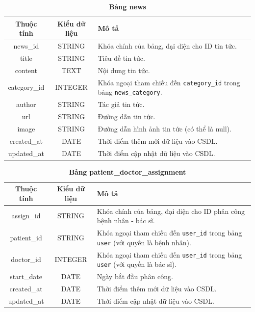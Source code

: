 \begin{table}[H]
  \caption{\bfseries \fontsize{12pt}{0pt}\selectfont Bảng news}
  \centering
  \begin{tabularx}{0.9\textwidth}{|c|c|X|}
    \hline
    \textbf{Thuộc tính} & \textbf{Kiểu dữ liệu} & \textbf{Mô tả} \\
    \hline
    news\_id & STRING & Khóa chính của bảng, đại diện cho ID tin tức. \\
    \hline
    title & STRING & Tiêu đề tin tức. \\
    \hline
    content & TEXT & Nội dung tin tức. \\
    \hline
    category\_id & INTEGER & Khóa ngoại tham chiếu đến \texttt{category\_id} trong bảng \texttt{news\_category}. \\
    \hline
    author & STRING & Tác giả tin tức. \\
    \hline
    url & STRING & Đường dẫn tin tức. \\
    \hline
    image & STRING & Đường dẫn hình ảnh tin tức (có thể là null). \\
    \hline
    created\_at & DATE & Thời điểm thêm mới dữ liệu vào CSDL. \\
    \hline
    updated\_at & DATE & Thời điểm cập nhật dữ liệu vào CSDL. \\
    \hline
  \end{tabularx}
\end{table}

\begin{table}[H]
  \caption{\bfseries \fontsize{12pt}{0pt}\selectfont Bảng patient\_doctor\_assignment}
  \centering
  \begin{tabularx}{0.9\textwidth}{|c|c|X|}
    \hline
    \textbf{Thuộc tính} & \textbf{Kiểu dữ liệu} & \textbf{Mô tả} \\
    \hline
    assign\_id & STRING & Khóa chính của bảng, đại diện cho ID phân công bệnh nhân - bác sĩ. \\
    \hline
    patient\_id & STRING & Khóa ngoại tham chiếu đến \texttt{user\_id} trong bảng \texttt{user} (với quyền là bệnh nhân). \\
    \hline
    doctor\_id & INTEGER & Khóa ngoại tham chiếu đến \texttt{user\_id} trong bảng \texttt{user} (với quyền là bác sĩ). \\
    \hline
    start\_date & DATE & Ngày bắt đầu phân công. \\
    \hline
    created\_at & DATE & Thời điểm thêm mới dữ liệu vào CSDL. \\
    \hline
    updated\_at & DATE & Thời điểm cập nhật dữ liệu vào CSDL. \\
    \hline
  \end{tabularx}
\end{table}

